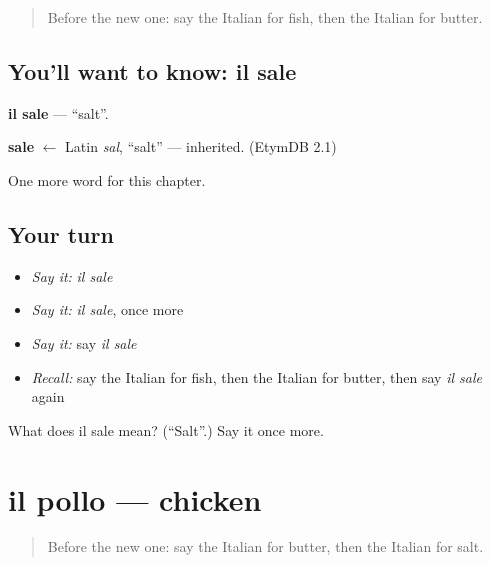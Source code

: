 \label{lesson:IT-C51-sale}



\begin{quote}
Before the new one: say the Italian for fish, then the Italian for butter.
\end{quote}

\subsection*{You'll want to know: il sale}
\textbf{il sale} — \textquotedblleft{}salt\textquotedblright{}.

\begin{cousinweb}
\textbf{sale} $\leftarrow$ Latin \emph{sal}, \textquotedblleft{}salt\textquotedblright{} — inherited. (EtymDB 2.1)
\end{cousinweb}

\begin{grammarlens}[title={What you've built}]
One more word for this chapter.
\end{grammarlens}

\subsection*{Your turn}
\begin{itemize}
\raggedright
  \item \emph{Say it:} \emph{il sale}
  \item \emph{Say it:} \emph{il sale}, once more
  \item \emph{Say it:} say \emph{il sale}
  \item \emph{Recall:} say the Italian for fish, then the Italian for butter, then say \emph{il sale} again
\end{itemize}

\begin{tcolorbox}[breakable,colback=teal!4,colframe=teal!35!black,title={Before you move on}]
What does il sale mean? (\textquotedblleft{}Salt\textquotedblright{}.) Say it once more.
\end{tcolorbox}
\section[il pollo]{il pollo — chicken}

\label{lesson:IT-C51-pollo}



\begin{quote}
Before the new one: say the Italian for butter, then the Italian for salt.
\end{quote}

